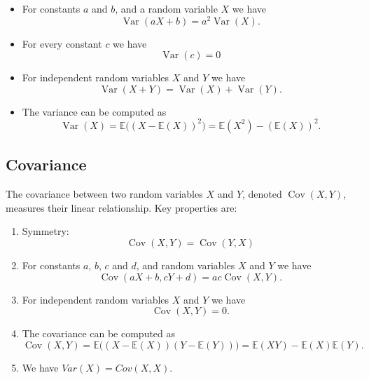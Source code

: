 \documentclass[
  a4paper,
]{article}
\theoremstyle{definition}
\theoremstyle{definition}
\theoremstyle{definition}
\theoremstyle{definition}
\theoremstyle{remark}
\begin{document}
\begin{itemize}
\item
  For constants \(a\) and \(b\), and a random variable \(X\) we have
  \begin{equation*}
    \mathop{\mathrm{Var}}(aX + b) = a^2 \mathop{\mathrm{Var}}(X).
  \end{equation*}
\item
  For every constant \(c\) we have
  \begin{equation*}
    \mathop{\mathrm{Var}}(c) = 0
  \end{equation*}
\item
  For independent random variables \(X\) and \(Y\) we have
  \begin{equation*}
    \mathop{\mathrm{Var}}(X + Y) = \mathop{\mathrm{Var}}(X) + \mathop{\mathrm{Var}}(Y).
  \end{equation*}
\item
  The variance can be computed as
  \begin{equation*}
    \mathop{\mathrm{Var}}(X)
    = \mathbb{E}\bigl( (X - \mathbb{E}(X))^2 \bigr)
    = \mathbb{E}(X^2) - (\mathbb{E}(X))^2.
  \end{equation*}
\end{itemize}

\subsection{Covariance}\label{covariance}

The covariance between two random variables \(X\) and \(Y\), denoted \(\mathop{\mathrm{Cov}}(X, Y)\),
measures their linear relationship. Key properties are:

\begin{enumerate}
\def\labelenumi{\arabic{enumi}.}
\item
  Symmetry:
  \begin{equation*}
     \mathop{\mathrm{Cov}}(X, Y) = \mathop{\mathrm{Cov}}(Y, X)
   \end{equation*}
\item
  For constants \(a\), \(b\), \(c\) and \(d\), and random variables \(X\) and \(Y\)
  we have
  \begin{equation*}
   \mathop{\mathrm{Cov}}(aX + b, cY + d) = ac \mathop{\mathrm{Cov}}(X, Y).
    \end{equation*}
\item
  For independent random variables \(X\) and \(Y\) we have
  \begin{equation*}
   \mathop{\mathrm{Cov}}(X, Y) = 0.
    \end{equation*}
\item
  The covariance can be computed as
  \begin{equation*}
   \mathop{\mathrm{Cov}}(X, Y)
   = \mathbb{E}\bigl( (X - \mathbb{E}(X)) (Y - \mathbb{E}(Y)) \bigr)
   = \mathbb{E}(XY) - \mathbb{E}(X) \mathbb{E}(Y).
    \end{equation*}
\item
  We have \(Var(X) = Cov(X, X)\).
\end{enumerate}
\end{document}
